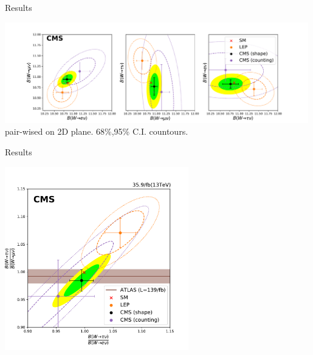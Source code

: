 \begin{frame}{Results}
    \begin{center}
    \includegraphics[width=0.99\textwidth]{chapters/Analysis/sectionResult/figures/result_contours_2d_br_dash.pdf}
    pair-wised \BWl on 2D plane. 68\%,95\% C.I. countours.
    \end{center}
\end{frame}

\begin{frame}{Results}
    \begin{center}
        \includegraphics[width=0.6\textwidth]{chapters/Analysis/sectionResult/figures/result_contours_2d_ratio_symmetric.pdf}
    \end{center}
\end{frame}




